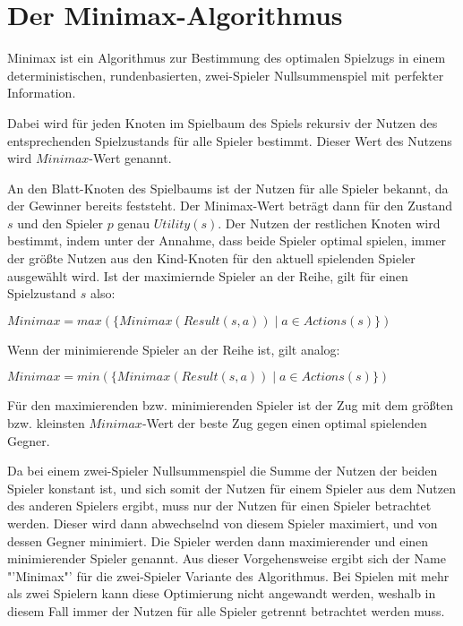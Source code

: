 \section{Der Minimax-Algorithmus}

Minimax ist ein Algorithmus zur Bestimmung des optimalen Spielzugs in einem deterministischen, rundenbasierten, zwei-Spieler Nullsummenspiel mit perfekter Information.

Dabei wird für jeden Knoten im Spielbaum des Spiels rekursiv der Nutzen des entsprechenden Spielzustands für alle Spieler bestimmt.
Dieser Wert des Nutzens wird $Minimax$-Wert genannt.

An den Blatt-Knoten des Spielbaums ist der Nutzen für alle Spieler bekannt, da der Gewinner bereits feststeht.
Der Minimax-Wert beträgt dann für den Zustand $s$ und den Spieler $p$ genau $Utility(s)$.
Der Nutzen der restlichen Knoten wird bestimmt, indem unter der Annahme, dass beide Spieler optimal spielen, immer der größte Nutzen aus den Kind-Knoten für den aktuell spielenden Spieler ausgewählt wird.
Ist der maximiernde Spieler an der Reihe, gilt für einen Spielzustand $s$ also:

\hspace*{1.3cm}
$Minimax=max(\{Minimax(Result(s, a)) \mid a \in Actions(s)\})$

Wenn der minimierende Spieler an der Reihe ist, gilt analog:

\hspace*{1.3cm}
$Minimax=min(\{Minimax(Result(s, a)) \mid a \in Actions(s)\})$

Für den maximierenden bzw. minimierenden Spieler ist der Zug mit dem größten bzw. kleinsten $Minimax$-Wert der beste Zug gegen einen optimal spielenden Gegner.
\cite[S.~164f.]{ai2010russel}

Da bei einem zwei-Spieler Nullsummenspiel die Summe der Nutzen der beiden Spieler konstant ist, und sich somit der Nutzen für einem Spieler aus dem Nutzen des anderen Spielers ergibt, muss nur der Nutzen für einen Spieler betrachtet werden.
Dieser wird dann abwechselnd von diesem Spieler maximiert, und von dessen Gegner minimiert.
Die Spieler werden dann maximierender und einen minimierender Spieler genannt.
Aus dieser Vorgehensweise ergibt sich der Name "'Minimax"' für die zwei-Spieler Variante des Algorithmus.
Bei Spielen mit mehr als zwei Spielern kann diese Optimierung nicht angewandt werden, weshalb in diesem Fall immer der Nutzen für alle Spieler getrennt betrachtet werden muss.
\cite[S.~165]{ai2010russel}




